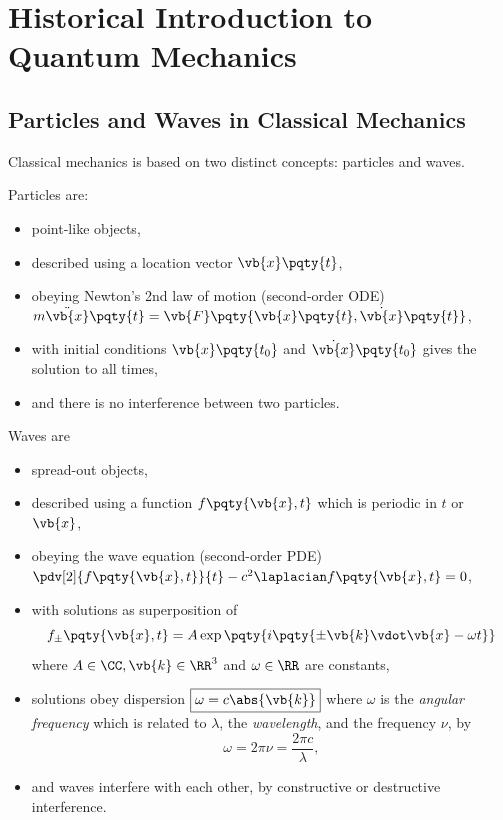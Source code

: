 \section{Historical Introduction to Quantum Mechanics}

\subsection{Particles and Waves in Classical Mechanics}

Classical mechanics is based on two distinct concepts: particles and waves.

Particles are:
\begin{itemize}
    \item point-like objects,
    \item described using a location vector \(\vb{x}\pqty{t}\),
    \item obeying Newton's 2nd law of motion (second-order ODE) \(m \ddot{\vb{x}}\pqty{t} = \vb{F}\pqty{\vb{x}\pqty{t}, \dot{\vb{x}}\pqty{t}}\),
    \item with initial conditions \(\vb{x}\pqty{t_0}\) and \(\dot{\vb{x}}\pqty{t_0}\) gives the solution to all times,
    \item and there is no interference between two particles.
\end{itemize}

Waves are 
\begin{itemize}
    \item spread-out objects,
    \item described using a function \(f\pqty{\vb{x}, t}\) which is periodic in \(t\) or \(\vb{x}\),
    \item obeying the wave equation (second-order PDE) \(\pdv[2]{f\pqty{\vb{x}, t}}{t} - c^2 \laplacian f\pqty{\vb{x}, t} = 0\),
    \item with solutions as superposition of
    \begin{equation}
        f_{\pm} \pqty{\vb{x}, t} = A \exp\pqty{i \pqty{\pm \vb{k} \vdot \vb{x} - \omega t}}
    \end{equation}
    where \(A \in \CC, \vb{k} \in \RR^3\) and \(\omega \in \RR\) are constants,
    \item solutions obey dispersion \(\boxed{\omega = c \abs{\vb{k}}}\) where \(\omega\) is the \emph{angular frequency} which is related to \(\lambda\), the \emph{wavelength}, and the frequency \(\nu\), by
    \begin{equation}
        \omega = 2\pi \nu = \frac{2\pi c}{\lambda},
    \end{equation}
    \item and waves interfere with each other, by constructive or destructive interference.
\end{itemize}

